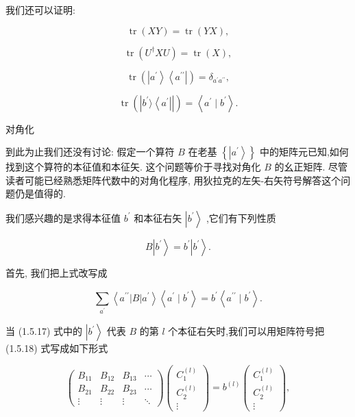 \documentclass[lang=cn,newtx,10pt,scheme=chinese,thmcnt=section]{elegantbook}
\begin{document}
我们还可以证明:

$$
\operatorname{tr}\left( {XY}\right) = \operatorname{tr}\left( {YX}\right) , \tag{1.5.16a}
$$

$$
\operatorname{tr}\left( {{U}^{ \dagger }{XU}}\right) = \operatorname{tr}\left( X\right) , \tag{1.5.16b}
$$

$$
\operatorname{tr}\left( {\left| {a}^{\prime }\right\rangle \left\langle {a}^{\prime \prime }\right| }\right) = {\delta }_{{a}^{\prime }{a}^{\prime \prime }}, \tag{1.5.16c}
$$

$$
\operatorname{tr}\left( \left| {{b}^{\prime }\rangle \left\langle {a}^{\prime }\right| }\right| \right) = \left\langle {{a}^{\prime } \mid {b}^{\prime }}\right\rangle . \tag{1.5.16d}
$$

对角化

到此为止我们还没有讨论: 假定一个算符 $B$ 在老基 $\left\{ \left| {a}^{\prime }\right\rangle \right\}$ 中的矩阵元已知,如何找到这个算符的本征值和本征矢. 这个问题等价于寻找对角化 $B$ 的幺正矩阵. 尽管读者可能已经熟悉矩阵代数中的对角化程序, 用狄拉克的左矢-右矢符号解答这个问题仍是值得的.

我们感兴趣的是求得本征值 ${b}^{\prime }$ 和本征右矢 $\left| {b}^{\prime }\right\rangle$ ,它们有下列性质

$$
B\left| {b}^{\prime }\right\rangle = {b}^{\prime }\left| {b}^{\prime }\right\rangle . \tag{1. 5.17}
$$

首先, 我们把上式改写成

$$
\mathop{\sum }\limits_{{a}^{\prime }}\left\langle {{a}^{\prime \prime }\left| B\right| {a}^{\prime }}\right\rangle \left\langle {{a}^{\prime } \mid {b}^{\prime }}\right\rangle = {b}^{\prime }\left\langle {{a}^{\prime \prime } \mid {b}^{\prime }}\right\rangle . \tag{1. 5.18}
$$

当 (1.5.17) 式中的 $\left| {b}^{\prime }\right\rangle$ 代表 $B$ 的第 $l$ 个本征右矢时,我们可以用矩阵符号把 (1.5.18) 式写成如下形式

$$
\left( \begin{matrix} {B}_{11} & {B}_{12} & {B}_{13} & \cdots \\ {B}_{21} & {B}_{22} & {B}_{23} & \cdots \\ \vdots & \vdots & \vdots & \ddots \end{matrix}\right) \left( \begin{matrix} {C}_{1}^{\left( l\right) } \\ {C}_{2}^{\left( l\right) } \\ \vdots \end{matrix}\right) = {b}^{\left( l\right) }\left( \begin{matrix} {C}_{1}^{\left( l\right) } \\ {C}_{2}^{\left( l\right) } \\ \vdots \end{matrix}\right) , \tag{1.5.19}
$$
\end{document}
